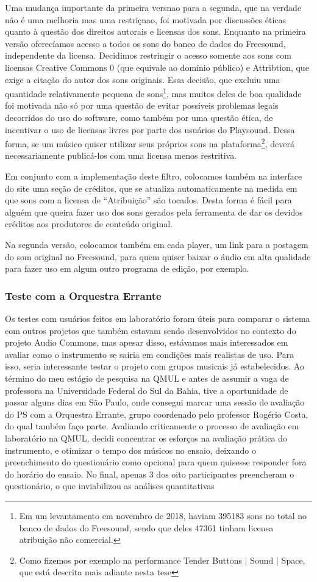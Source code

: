 Uma mudança importante da primeira versnao para a segunda, que na verdade não é uma melhoria mas uma restriçnao, foi motivada por discussões éticas quanto à questão dos direitos autorais e licensas dos sons. Enquanto na primeira versão oferecíamos acesso a todos os sons do banco de dados do Freesound, independente da licensa. Decidimos restringir o acesso somente aos sons com licensas Creative Commons 0 (que equivale ao domínio público) e Attribtion, que exige a citação do autor dos sons originais. Essa decisão, que excluiu uma quantidade relativamente pequena de sons\footnote{Em um levantamento em novembro de 2018, haviam 395183 sons no total no banco de dados do Freesound, sendo que deles 47361 tinham licensa atribuição não comercial.}, mas muitos deles de boa qualidade foi motivada não só por uma questão de evitar possíveis problemas legais decorridos do uso do software, como também por uma questão ética, de incentivar o uso de licensas livres por parte dos usuários do Playsound. Dessa forma, se um músico quiser utilizar seus próprios sons na plataforma\footnote{Como fizemos por exemplo na performance Tender Buttons | Sound | Space, que está descrita mais adiante nesta tese}, deverá necessariamente publicá-los com uma licensa menos restritiva. 

Em conjunto com a implementação deste filtro, colocamos também na interface do site uma seção de créditos, que se atualiza automaticamente na medida em que sons com a licensa de ``Atribuição'' são tocados. Desta forma é fácil para alguém que queira fazer uso dos sons gerados pela ferramenta de dar os devidos créditos aos produtores de conteúdo original. 

Na segunda versão, colocamos também em cada player, um link para a postagem do som original no Freesound, para quem quiser baixar o áudio em alta qualidade para fazer uso em algum outro programa de edição, por exemplo. 



\subsubsection{Teste com a Orquestra Errante}
Os testes com usuários feitos em laboratório foram úteis para comparar o sistema com outros projetos que também estavam sendo desenvolvidos no contexto do projeto Audio Commons, mas apesar disso, estávamos mais interessados em avaliar como o instrumento se sairia em condições mais realistas de uso. Para isso, seria interessante testar o projeto com grupos musicais já estabelecidos. Ao término do meu estágio de pesquisa na QMUL e antes de assumir a vaga de professora na Universidade Federal do Sul da Bahia, tive a oportunidade de passar alguns dias em São Paulo, onde consegui marcar uma sessão de avaliação do PS com a Orquestra Errante, grupo coordenado pelo professor Rogério Costa, do qual também faço parte. Avaliando criticamente o processo de avaliação em laboratório na QMUL, decidi concentrar os esforços na avaliação prática do instrumento, e otimizar o tempo dos músicos no ensaio, deixando o preenchimento do questionário como opcional para quem quisesse responder fora do horário do ensaio. No final, apenas 3 dos oito participantes preencheram o questionário, o que inviabilizou as análises quantitativas

